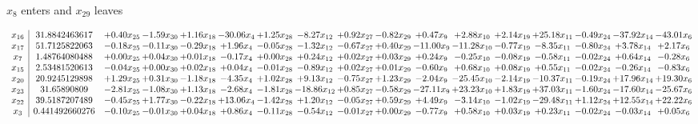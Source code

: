\documentclass[9pt]{article}
\begin{document}
 $ x_{8} $ enters and $ x_{29} $ leaves 

 \[\begin{array}{c| c c@{\hskip 2pt} c@{\hskip 2pt} c@{\hskip 2pt} c@{\hskip 2pt} c@{\hskip 2pt} c@{\hskip 2pt} c@{\hskip 2pt} c@{\hskip 2pt} c@{\hskip 2pt} c@{\hskip 2pt} c@{\hskip 2pt} c@{\hskip 2pt} c@{\hskip 2pt} c@{\hskip 2pt} c@{\hskip 2pt} }
 x_{16}   &  31.8842463617 & +  0.40 x_{25} & -1.59 x_{30} & +  1.16 x_{18} & -30.06 x_{4} & +  1.25 x_{28} & -8.27 x_{12} & +  0.92 x_{27} & -0.82 x_{29} & +  0.47 x_{9} & +  2.88 x_{10} & +  2.14 x_{19} & + 25.18 x_{11} & -0.49 x_{24} & -37.92 x_{14} & -43.01 x_{6}\\
 x_{17}   &  51.7125822063 & -0.18 x_{25} & -0.11 x_{30} & -0.29 x_{18} & +  1.96 x_{4} & -0.05 x_{28} & -1.32 x_{12} & -0.67 x_{27} & +  0.40 x_{29} & -11.00 x_{9} & -11.28 x_{10} & -0.77 x_{19} & -8.35 x_{11} & -0.80 x_{24} & +  3.78 x_{14} & +  2.17 x_{6}\\
 x_{7}   &  1.48764080488 & +  0.00 x_{25} & +  0.04 x_{30} & +  0.01 x_{18} & -0.17 x_{4} & +  0.00 x_{28} & +  0.24 x_{12} & +  0.02 x_{27} & +  0.03 x_{29} & +  0.24 x_{9} & -0.25 x_{10} & -0.08 x_{19} & -0.58 x_{11} & -0.02 x_{24} & +  0.64 x_{14} & -0.28 x_{6}\\
 x_{15}   &  2.53481520613 & -0.04 x_{25} & +  0.00 x_{30} & +  0.02 x_{18} & +  0.04 x_{4} & -0.01 x_{28} & -0.89 x_{12} & +  0.02 x_{27} & +  0.01 x_{29} & -0.60 x_{9} & +  0.68 x_{10} & +  0.08 x_{19} & +  0.55 x_{11} & -0.02 x_{24} & -0.26 x_{14} & -0.83 x_{6}\\
 x_{20}   &  20.9245129898 & +  1.29 x_{25} & +  0.31 x_{30} & -1.18 x_{18} & -4.35 x_{4} & +  1.02 x_{28} & +  9.13 x_{12} & -0.75 x_{27} & +  1.23 x_{29} & -2.04 x_{9} & -25.45 x_{10} & -2.14 x_{19} & -10.37 x_{11} & -0.19 x_{24} & + 17.96 x_{14} & + 19.30 x_{6}\\
 x_{23}   &  31.65890809 & -2.81 x_{25} & -1.08 x_{30} & +  1.13 x_{18} & -2.68 x_{4} & -1.81 x_{28} & -18.86 x_{12} & +  0.85 x_{27} & -0.58 x_{29} & -27.11 x_{9} & + 23.23 x_{10} & +  1.83 x_{19} & + 37.03 x_{11} & -1.60 x_{24} & -17.60 x_{14} & -25.67 x_{6}\\
 x_{22}   &  39.5187207489 & -0.45 x_{25} & +  1.77 x_{30} & -0.22 x_{18} & + 13.06 x_{4} & -1.42 x_{28} & +  1.20 x_{12} & -0.05 x_{27} & +  0.59 x_{29} & +  4.49 x_{9} & -3.14 x_{10} & -1.02 x_{19} & -29.48 x_{11} & +  1.12 x_{24} & + 12.55 x_{14} & + 22.22 x_{6}\\
 x_{3}   &  0.441492660276 & -0.10 x_{25} & -0.01 x_{30} & +  0.04 x_{18} & +  0.86 x_{4} & -0.11 x_{28} & -0.54 x_{12} & -0.01 x_{27} & +  0.00 x_{29} & -0.77 x_{9} & +  0.58 x_{10} & +  0.03 x_{19} & +  0.23 x_{11} & -0.02 x_{24} & -0.03 x_{14} & +  0.05 x_{6}\\

\end{array}\]
\end{document}
